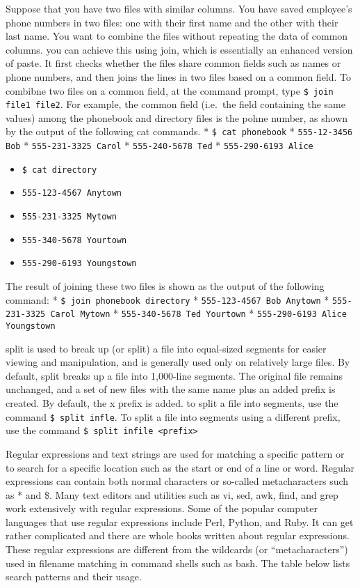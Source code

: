 Suppose that you have two files with similar columns. You have saved
employee's phone numbers in two files: one with their first name and the
other with their last name. You want to combine the files without
repeating the data of common columns. you can achieve this using join,
which is essentially an enhanced version of paste. It first checks
whether the files share common fields such as names or phone numbers,
and then joins the lines in two files based on a common field. To
combibne two files on a common field, at the command prompt, type
\texttt{\$ join file1 file2}. For example, the common field (i.e.~the
field containing the same values) among the phonebook and directory
files is the pohne number, as shown by the output of the following cat
commands. * \texttt{\$ cat phonebook} * \texttt{555-12-3456 Bob} *
\texttt{555-231-3325 Carol} * \texttt{555-240-5678 Ted} *
\texttt{555-290-6193 Alice}

\begin{itemize}
\itemsep1pt\parskip0pt
\item
  \texttt{\$ cat directory}
\item
  \texttt{555-123-4567 Anytown}
\item
  \texttt{555-231-3325 Mytown}
\item
  \texttt{555-340-5678 Yourtown}
\item
  \texttt{555-290-6193 Youngstown}
\end{itemize}

The result of joining these two files is shown as the output of the
following command: * \texttt{\$ join phonebook directory} *
\texttt{555-123-4567 Bob Anytown} * \texttt{555-231-3325 Carol Mytown} *
\texttt{555-340-5678 Ted Yourtown} *
\texttt{555-290-6193 Alice Youngstown}

split is used to break up (or split) a file into equal-sized segments
for easier viewing and manipulation, and is generally used only on
relatively large files. By default, split breaks up a file into
1,000-line segments. The original file remains unchanged, and a set of
new files with the same name plus an added prefix is created. By
default, the x prefix is added. to split a file into segments, use the
command \texttt{\$ split infle}. To split a file into segments using a
different prefix, use the command
\texttt{\$ split infile \textless{}prefix\textgreater{}}

Regular expressions and text strings are used for matching a specific
pattern or to search for a specific location such as the start or end of
a line or word. Regular expressions can contain both normal characters
or so-called metacharacters such as * and \$. Many text editors and
utilities such as vi, sed, awk, find, and grep work extensively with
regular expressions. Some of the popular computer languages that use
regular expressions include Perl, Python, and Ruby. It can get rather
complicated and there are whole books written about regular expressions.
These regular expressions are different from the wildcards (or
``metacharacters'') used in filename matching in command shells such as
bash. The table below lists search patterns and their usage.

